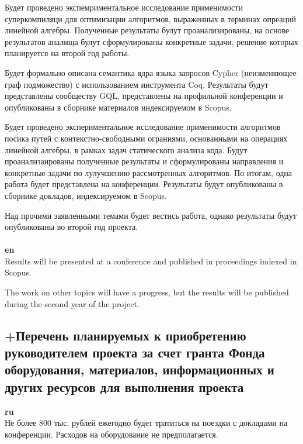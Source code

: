 \documentclass[12pt]{article}  %
\theoremstyle{remark}
\begin{document}
Будет проведено экспемриментальное исследование применимости суперкомпиляци для оптимизации алгоритмов, выраженных в терминах опреаций линейной алгебры. Полученные результаты булут проанализированы, на основе результатов аналища булут сформулированы конкретные задачи, решение которых планируется на второй год работы.

Будет формально описана семантика ядра языка запросов Cypher (неизменяющее граф подможество) с использованием инструмента Coq. Результаты будут представлены сообществу GQL, представлены на профильной конференции и опубликованы в сборнике материалов индексируемом в Scopus. 

Будет проведено экспериментальное исследование применимости алгоритмов посика путей с контекстно-свободными ограниями, основанными на операциях линейной алгебры, в рамках задач статического анализа кода. Будут проанализаированы полученные результаты и сформулированы направления и конкретные задачи по лулучшению рассмотренных алгоритмов. По итогам, одна работа будет представлена на конференции. Результаты будут опубликованы в сборнике докладов, индексируемом в Scopus.

Над прочими заявленными темами будет вестись работа, однако результаты будут опубликованы во второй год проекта.
\\
\\
\textbf{en}\\
Results will be presented at a conference and published in proceedings indexed in Scopus.

The work on other topics will have a progress, but the results will be published during the second year of the project.

\subsection{+Перечень планируемых к приобретению руководителем проекта за счет гранта Фонда оборудования, материалов, информационных и других ресурсов для выполнения проекта}

\textbf{ru}\\
%
Не более 800 тыс. рублей ежегодно будет тратиться на поездки с докладами на конференции. Расходов на оборудование не предполагается.
\end{document}
